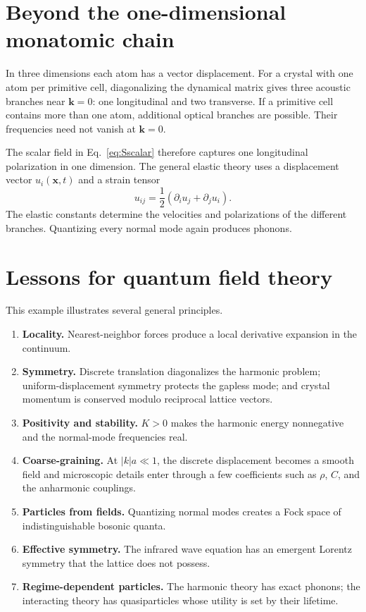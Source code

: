 \documentclass[11pt]{article}
\begin{document}
\section{Beyond the one-dimensional monatomic chain}

In three dimensions each atom has a vector displacement.  For a crystal with
one atom per primitive cell, diagonalizing the dynamical matrix gives three
acoustic branches near $\bm k=0$: one longitudinal and two transverse.  If a
primitive cell contains more than one atom, additional optical branches are
possible.  Their frequencies need not vanish at $\bm k=0$.

The scalar field in Eq.~\eqref{eq:Sscalar} therefore captures one
longitudinal polarization in one dimension.  The general elastic theory uses
a displacement vector $u_i(\bm x,t)$ and a strain tensor
\begin{equation}
  u_{ij}=\frac12(\partial_i u_j+\partial_j u_i).
\end{equation}
The elastic constants determine the velocities and polarizations of the
different branches.  Quantizing every normal mode again produces phonons.

\section{Lessons for quantum field theory}

This example illustrates several general principles.
\begin{enumerate}
  \item \textbf{Locality.}  Nearest-neighbor forces produce a local
  derivative expansion in the continuum.
  \item \textbf{Symmetry.}  Discrete translation diagonalizes the harmonic
  problem; uniform-displacement symmetry protects the gapless mode; and
  crystal momentum is conserved modulo reciprocal lattice vectors.
  \item \textbf{Positivity and stability.}  $K>0$ makes the harmonic energy
  nonnegative and the normal-mode frequencies real.
  \item \textbf{Coarse-graining.}  At $|k|a\ll1$, the discrete displacement
  becomes a smooth field and microscopic details enter through a few
  coefficients such as $\rho$, $C$, and the anharmonic couplings.
  \item \textbf{Particles from fields.}  Quantizing normal modes creates a
  Fock space of indistinguishable bosonic quanta.
  \item \textbf{Effective symmetry.}  The infrared wave equation has an
  emergent Lorentz symmetry that the lattice does not possess.
  \item \textbf{Regime-dependent particles.}  The harmonic theory has exact
  phonons; the interacting theory has quasiparticles whose utility is set by
  their lifetime.
\end{enumerate}
\end{document}
